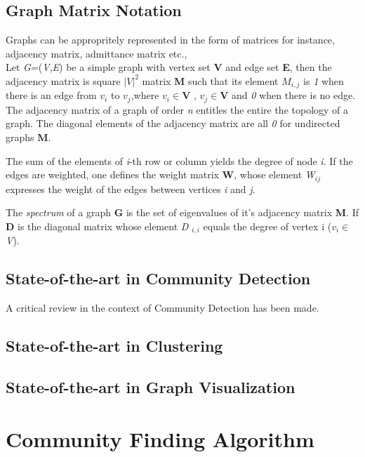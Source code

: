 \subsection{Graph Matrix Notation}
Graphs can be appropritely represented in the form of matrices for instance, adjacency matrix, admittance matrix etc.,
\\
Let \textit{G}=(\textit{V},\textit{E}) be a simple graph with vertex set \textbf{V} and edge set \textbf{E}, then the adjacency matrix is square $|V|^2$ matrix \textbf{M} such that its element $M_{i,j}$ is \textit{1} when there is an edge from $v_i$ to $v_j$,where $v_i \in \textbf{V}$ , $ v_j \in \textbf{V}$ and \textit{0} when there is no edge.
The adjacency matrix of a graph of order \textit{n} entitles the entire the topology of a graph.  The diagonal elements of the adjacency matrix are all \textit{0} for undirected graphs \textbf{M}.
\par The sum of the elements of \textit{i}-th row or column yields the degree of node \textit{i}. If the edges are weighted, one defines the weight matrix \textbf{W}, whose element \textit{W}$_{ij}$ expresses the weight of the edges between vertices \textit{i} and \textit{j}.

\par The \textit{spectrum} of a graph \textbf{G} is the set of eigenvalues of it's adjacency matrix \textbf{M}. If \textbf{D}  is the diagonal matrix whose element \textit{D} $_{i,i}$ equals the degree of vertex i ($v_i \in$ \textit{V}).



\subsection{State-of-the-art in Community Detection}
A critical review in the context of Community Detection has been made.  


\subsection{State-of-the-art in Clustering}
\subsection{State-of-the-art in Graph Visualization}

\section{Community Finding Algorithm}
